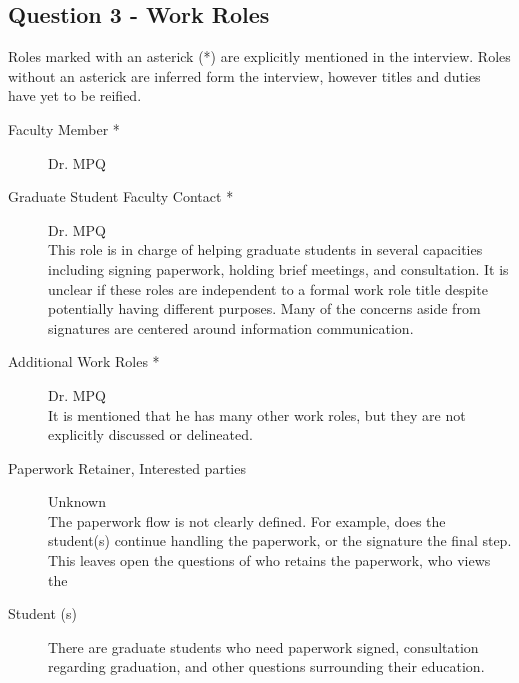 \documentclass[11pt]{article}
\begin{document}
  \subsection{Question 3 - Work Roles}
  Roles marked with an asterick (\**) are explicitly mentioned in the interview.   Roles without an asterick are inferred form the interview, however titles and duties have yet to be reified.
  \begin{description} %
  \item[Faculty Member \**]
  Dr. MPQ\\
  \item[Graduate Student Faculty Contact \**]
  Dr. MPQ\\
  This role is in charge of helping graduate students in several capacities including signing paperwork, holding brief meetings, and consultation.  It is unclear if these roles are independent to a formal work role title despite potentially having different purposes.  Many of the concerns aside from signatures are centered around information communication.

  \item[Additional Work Roles \**]
  Dr. MPQ\\
  It is mentioned that he has many other work roles, but they are not explicitly discussed or delineated.

  \item[Paperwork Retainer, Interested parties]
  Unknown\\
  The paperwork flow is not clearly defined.  For example, does the student(s) continue handling the paperwork, or the signature the final step.  This leaves open the questions of who retains the paperwork, who views the 

  \item[Student (s)]
  There are graduate students who need paperwork signed, consultation regarding graduation, and other questions surrounding their education.
  
  \end{description}
\end{document}
